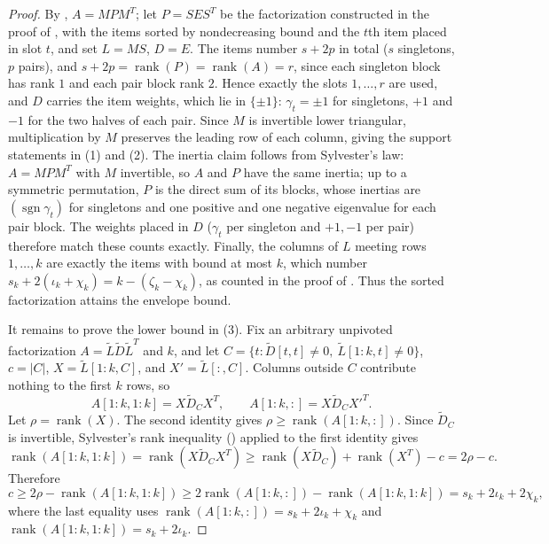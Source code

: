 \documentclass[preprint,12pt]{elsarticle}
\theoremstyle{plain}
\theoremstyle{nonumberplain}
\newtheorem{proof}{Proof}
\numberwithin{equation}{section}
\DeclareMathOperator{\rk}{rank}
\DeclareMathOperator{\sgn}{sgn}
\numberwithin{theorem}{section}
\begin{document}
\begin{proof}
  By , $A = M P M^T$; let $P = S E S^T$ be the factorization constructed in the proof of , with the items sorted by nondecreasing bound and the $t$th item placed in slot $t$, and set $L = MS$, $D = E$. The items number $s + 2p$ in total ($s$ singletons, $p$ pairs), and $s + 2p = \rk(P) = \rk(A) = r$, since each singleton block has rank $1$ and each pair block rank $2$. Hence exactly the slots $1, \ldots, r$ are used, and $D$ carries the item weights, which lie in $\{\pm 1\}$: $\gamma_t = \pm 1$ for singletons, $+1$ and $-1$ for the two halves of each pair. Since $M$ is invertible lower triangular, multiplication by $M$ preserves the leading row of each column, giving the support statements in (1) and (2). The inertia claim follows from Sylvester's law: $A = MPM^T$ with $M$ invertible, so $A$ and $P$ have the same inertia; up to a symmetric permutation, $P$ is the direct sum of its blocks, whose inertias are $(\sgn \gamma_t)$ for singletons and one positive and one negative eigenvalue for each pair block. The weights placed in $D$ ($\gamma_t$ per singleton and $+1,-1$ per pair) therefore match these counts exactly. Finally, the columns of $L$ meeting rows $1,\ldots,k$ are exactly the items with bound at most $k$, which number $s_k+2(\iota_k+\chi_k)=k-(\zeta_k-\chi_k)$, as counted in the proof of . Thus the sorted factorization attains the envelope bound.

  It remains to prove the lower bound in (3). Fix an arbitrary unpivoted factorization $A=\widetilde L\widetilde D\widetilde L^T$ and $k$, and let $C=\{t\colon \widetilde D[t,t]\neq0,\ \widetilde L[1:k,t]\neq0\}$, $c=|C|$, $X=\widetilde L[1:k,C]$, and $X'=\widetilde L[:,C]$. Columns outside $C$ contribute nothing to the first $k$ rows, so
  \[
    A[1:k, 1:k] = X \widetilde D_C X^T,
    \qquad
    A[1:k, :] = X \widetilde D_C X'^T .
  \]
  Let $\rho=\rk(X)$. The second identity gives $\rho\ge\rk(A[1:k,:])$. Since $\widetilde D_C$ is invertible, Sylvester's rank inequality () applied to the first identity gives
  \[
    \rk(A[1:k,1:k])
    =\rk(X\widetilde D_CX^T)
    \ge \rk(X\widetilde D_C)+\rk(X^T)-c
    =2\rho-c.
  \]
  Therefore
  \[
    c\ge 2\rho-\rk(A[1:k,1:k])
    \ge 2\rk(A[1:k,:])-\rk(A[1:k,1:k])
    =s_k+2\iota_k+2\chi_k,
  \]
  where the last equality uses $\rk(A[1:k,:])=s_k+2\iota_k+\chi_k$ and $\rk(A[1:k,1:k])=s_k+2\iota_k$.
\end{proof}
\end{document}
